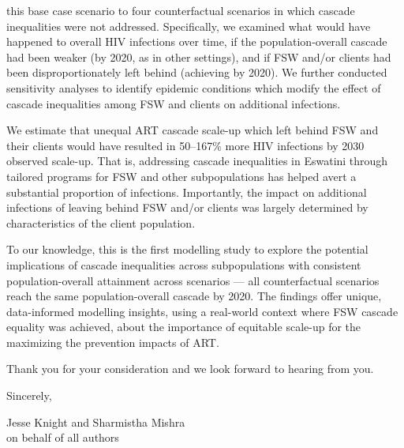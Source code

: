 this base case scenario to four counterfactual scenarios in which
cascade inequalities were not addressed.
Specifically, we examined what would have happened to overall HIV infections over time,
if the population-overall cascade had been weaker (\casmd by 2020, as in other settings),
and if FSW and/or clients had been disproportionately left behind (achieving \caslo by 2020).
We further conducted sensitivity analyses to identify epidemic conditions which modify
the effect of cascade inequalities among FSW and clients on additional infections.
\par
We estimate that unequal ART cascade scale-up which left behind FSW and their clients
would have resulted in 50--167\% more HIV infections by 2030 \vs observed scale-up.
That is, addressing cascade inequalities in Eswatini
through tailored programs for FSW and other subpopulations
has helped avert a substantial proportion of infections.
Importantly, the impact on additional infections of
leaving behind FSW and/or clients was largely determined by
characteristics of the client population.
\par\pagebreak %
To our knowledge, this is the first modelling study to explore
the potential implications of cascade inequalities across subpopulations
with consistent population-overall attainment across scenarios ---
\ie all counterfactual scenarios reach the same population-overall cascade by 2020.
The findings offer unique, data-informed modelling insights,
using a real-world context where FSW cascade equality was achieved,
about the importance of equitable scale-up
for the maximizing the prevention impacts of ART.
\par
Thank you for your consideration and we look forward to hearing from you.
\medskip\par
Sincerely,
\par
Jesse Knight and Sharmistha Mishra\\
on behalf of all authors
